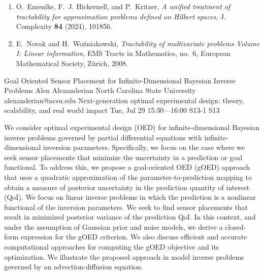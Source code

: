 \begin{talk}
\begin{enumerate}
 \item
O.~Emenike, F.~J. Hickernell, and P.~Kritzer, \emph{A unified treatment of tractability for approximation problems defined on {H}ilbert spaces}, J. Complexity \textbf{84} (2024), 101856.

\item 
E.~Novak and H.~Wo{\'{z}}niakowski, \emph{Tractability of multivariate problems {V}olume {I}: {L}inear information}, EMS Tracts in Mathematics, no.~6, European Mathematical Society, Z\"urich, 2008.

\end{enumerate}


\end{talk}

\begin{talk}
  {Goal Oriented Sensor Placement for Infinite-Dimensional Bayesian Inverse Problems}%
  {Alen Alexanderian}%
  {North Carolina State University}%
  {alexanderian@ncsu.edu}%
  {Next-generation optimal experimental design: theory, scalability, and real world impact}%
  {}%
  {Tue, Jul 29 15:30---16:00}%
  {S13-1}%
  {S13}%
    
   
We consider optimal experimental design (OED) for infinite-dimensional Bayesian
inverse problems governed by partial differential equations with
infinite-dimensional inversion parameters.  Specifically, we focus on the case
where we seek sensor placements that minimize the uncertainty in a prediction or
goal functional.  To address this, we propose a goal-oriented OED (gOED)
approach that uses a quadratic approximation of the parameter-to-prediction
mapping to obtain a measure of posterior uncertainty in the prediction quantity
of interest (QoI).  We focus on linear inverse problems in which the prediction
is a nonlinear functional of the inversion parameters. We seek to find sensor
placements that result in minimized posterior variance of the prediction QoI. In
this context, and under the assumption of Gaussian prior and noise models, we
derive a closed-form expression for the gOED criterion. We also discuss
efficient and accurate computational approaches for computing the gOED objective
and its optimization.  We illustrate the proposed approach in model inverse
problems governed by an advection-diffusion equation.

\medskip

\end{talk}


